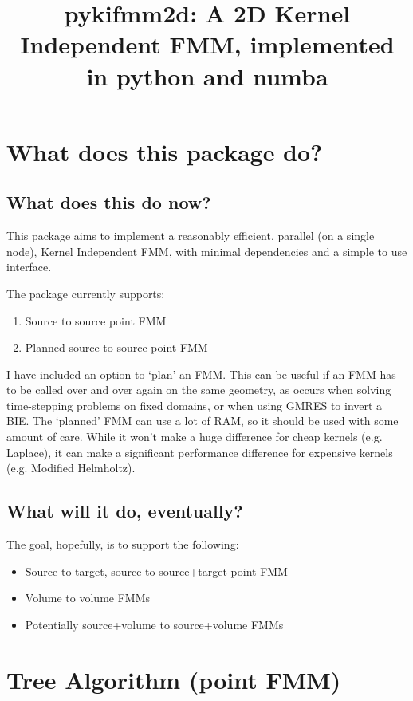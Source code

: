 \documentclass{article}
\title{pykifmm2d: A 2D Kernel Independent FMM, implemented in python and numba}
\begin{document}
\maketitle

\section{What does this package do?}

\subsection{What does this do now?}

This package aims to implement a reasonably efficient, parallel (on a single node), Kernel Independent FMM, with minimal dependencies and a simple to use interface.

The package currently supports:
\begin{enumerate}
	\item Source to source point FMM
	\item Planned source to source point FMM
\end{enumerate}

I have included an option to `plan' an FMM. This can be useful if an FMM has to be called over and over again on the same geometry, as occurs when solving time-stepping problems on fixed domains, or when using GMRES to invert a BIE. The `planned' FMM can use a lot of RAM, so it should be used with some amount of care. While it won't make a huge difference for cheap kernels (e.g. Laplace), it can make a significant performance difference for expensive kernels (e.g. Modified Helmholtz).

\subsection{What will it do, eventually?}

The goal, hopefully, is to support the following:
\begin{itemize}
	\item Source to target, source to source+target point FMM
	\item Volume to volume FMMs
	\item Potentially source+volume to source+volume FMMs
\end{itemize}

\section{Tree Algorithm (point FMM)}
\end{document}
